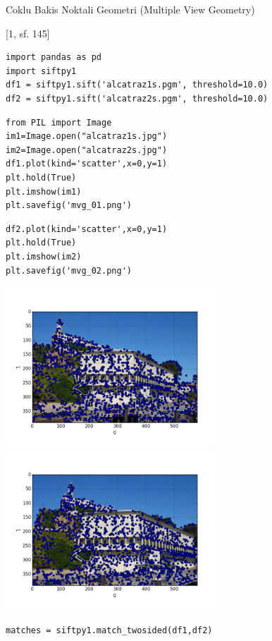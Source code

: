 \documentclass[12pt,fleqn]{article}\usepackage{../common}
\begin{document}
Coklu Bakis Noktali Geometri (Multiple View Geometry)

[1, sf. 145]

\begin{verbatim}
import pandas as pd
import siftpy1
df1 = siftpy1.sift('alcatraz1s.pgm', threshold=10.0)
df2 = siftpy1.sift('alcatraz2s.pgm', threshold=10.0)
\end{verbatim}

\begin{verbatim}
from PIL import Image
im1=Image.open("alcatraz1s.jpg")
im2=Image.open("alcatraz2s.jpg")
df1.plot(kind='scatter',x=0,y=1)
plt.hold(True)
plt.imshow(im1)
plt.savefig('mvg_01.png')
\end{verbatim}

\begin{verbatim}
df2.plot(kind='scatter',x=0,y=1)
plt.hold(True)
plt.imshow(im2)
plt.savefig('mvg_02.png')
\end{verbatim}


\includegraphics[height=6cm]{mvg_01.png}
\includegraphics[height=6cm]{mvg_02.png}

\begin{verbatim}
matches = siftpy1.match_twosided(df1,df2)
\end{verbatim}
\end{document}
